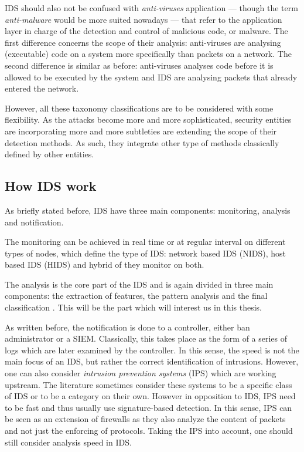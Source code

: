 IDS should also not be confused with \emph{anti-viruses} application --- though the term \emph{anti-malware} would be more suited nowadays --- that refer to the application layer in charge of the detection and control of malicious code, or malware. The first difference concerns the scope of their analysis: anti-viruses are analysing (executable) code on a system more specifically than packets on a network. The second difference is similar as before: anti-viruses analyses code before it is allowed to be executed by the system and IDS are analysing packets that already entered the network.

However, all these taxonomy classifications are to be considered with some flexibility. As the attacks become more and more sophisticated, security entities are incorporating more and more subtleties are extending the scope of their detection methods. As such, they integrate other type of methods classically defined by other entities.

\subsection{How IDS work}
As briefly stated before, IDS have three main components: monitoring, analysis and notification. 

The monitoring can be achieved in real time or at regular interval on different types of nodes, which define the type of IDS: network based IDS (NIDS), host based IDS (HIDS) and hybrid of they monitor on both. 

The analysis is the core part of the IDS and is again divided in three main components: the extraction of features, the pattern analysis and the final classification \cite{Winter2018}. This will be the part which will interest us in this thesis.

As written before, the notification is done to a controller, either ban administrator or a SIEM. Classically, this takes place as the form of a series of logs which are later examined by the controller. In this sense, the speed is not the main focus of an IDS, but rather the correct identification of intrusions. However, one can also consider \emph{intrusion prevention systems} (IPS) which are working upstream. The literature sometimes consider these systems to be a specific class of IDS or to be a category on their own. However in opposition to IDS, IPS need to be fast and thus usually use signature-based detection. In this sense, IPS can be seen as an extension of firewalls as they also analyze the content of packets and not just the enforcing of protocols. Taking the IPS into account, one should still consider analysis speed in IDS.

